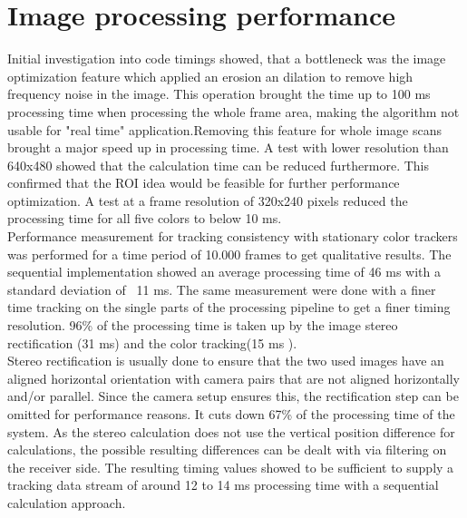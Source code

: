 \section{Image processing performance}
Initial investigation into code timings showed, that a bottleneck was the image optimization feature which applied an erosion an dilation to remove high frequency noise in the image. This operation brought the time up to 100 ms processing time when processing the whole frame area, making the algorithm  not usable for "real time" application.Removing this feature for whole image scans brought a major speed up in processing time. 
A test with lower resolution than 640x480 showed that the calculation time can be reduced furthermore. This confirmed that the ROI idea would be feasible for further performance optimization. A test at a frame resolution of 320x240 pixels reduced the processing time for all five colors to below 10 ms.\\
Performance measurement for tracking consistency with stationary color trackers was performed for a time period of 10.000 frames to get qualitative results. The sequential implementation showed an average processing time of 46 ms with a standard deviation of ~11 ms.
The same measurement were done with a finer time tracking on the single parts of the processing pipeline to get a finer timing resolution. 96\% of the processing time is taken up by the image stereo rectification (31 ms) and the color tracking(15 ms ).\\
Stereo rectification is usually done to ensure that the two used images have an aligned horizontal orientation with camera pairs that are not aligned horizontally and/or parallel. Since the camera setup ensures this, the rectification step can be omitted for performance reasons. It cuts down 67\% of the processing time of the system. As the stereo calculation does not use the vertical position difference for calculations, the possible resulting differences can be dealt with via filtering on the receiver side.
The resulting timing values showed to be sufficient to supply a tracking data stream of around 12 to 14 ms processing time with a sequential calculation approach.
